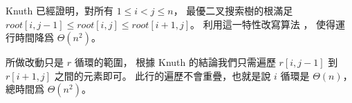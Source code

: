 \startEXERCISE
Knuth 已經證明，對所有 $1\le i < j \le n$，
最優二叉搜索樹的根滿足 $root[i,j-1]\le root[i,j]\le root[i+1,j]$。
利用這一特性改寫算法 ，
使得運行時間降爲 $\Theta(n^2)$。
\stopEXERCISE

\startANSWER
{}

所做改動只是 $r$ 循環的範圍，
根據 Knuth 的結論我們只需遍歷 $r[i,j-1]$ 到 $r[i+1,j]$ 之間的元素即可。
此行的遍歷不會重疊，也就是說 $i$ 循環是 $\Theta(n)$，
總時間爲 $\Theta(n^2)$。
\stopANSWER
